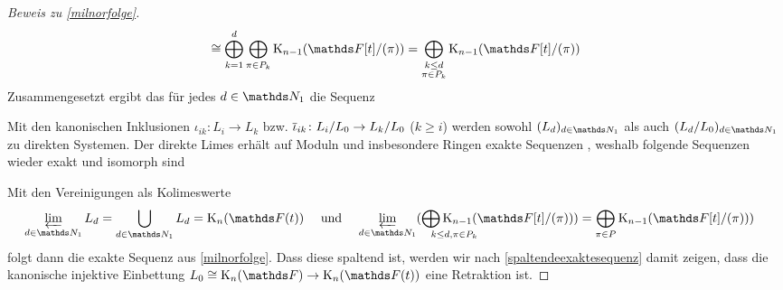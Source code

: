 \documentclass[ngerman,fontsize=11pt, paper=a4, parskip=half, titlepage=true, toc=bib]{scrartcl}
\begin{document}
\begin{proof}[Beweis zu \ref{milnorfolge}]
\begin{align}
    \cong \bigoplus_{k=1}^d\bigoplus_{\pi\in P_k} \K_{n-1}(\Ftpi)
    = \bigoplus_{\substack{k\leq d\\\pi\in P_k}}
    \K_{n-1}(\Ftpi)
  \end{align}
  Zusammengesetzt ergibt das für jedes $d\in\N_1$ die Sequenz
  \begin{center}
  \end{center}
  Mit den kanonischen Inklusionen $\iota_{ik}\colon L_i\to L_k$ 
  bzw. $\overline{\iota}_{ik}\colon L_i/L_0\to L_k/L_0$ ($k\geq i$) werden
  sowohl $(L_d)_{d\in\N_1}$ als auch $(L_d/L_0)_{d\in\N_1}$
  zu direkten Systemen.
  Der direkte Limes erhält auf Moduln und insbesondere Ringen exakte
  Sequenzen 
  \cite[siehe][III. §6.2, Prop. 3]{bourbaki},
  weshalb folgende Sequenzen wieder exakt und isomorph sind
  \begin{center}
  \end{center}
  Mit den Vereinigungen als Kolimeswerte
  \begin{align*}
    \varprojlim_{d\in\N_1}L_d
    &=\bigcup_{d\in\N_1}L_d=\KnFt
    &&\text{ und } 
    &\varprojlim_{d\in\N_1}
      (\bigoplus_{\mathrlap{k\leq d, \pi\in P_k}}
      \K_{n-1}(\Ftpi))
    &=\bigoplus_{\pi\in P}
      \K_{n-1}(\Ftpi))
  \end{align*}
  folgt dann die exakte Sequenz aus \ref{milnorfolge}.
  Dass diese spaltend ist, werden wir nach
  \ref{spaltendeexaktesequenz} damit zeigen, dass
  die kanonische injektive Einbettung $L_0\cong\KnF\to\KnFt$ 
  eine Retraktion ist.


\end{proof}
\end{document}
